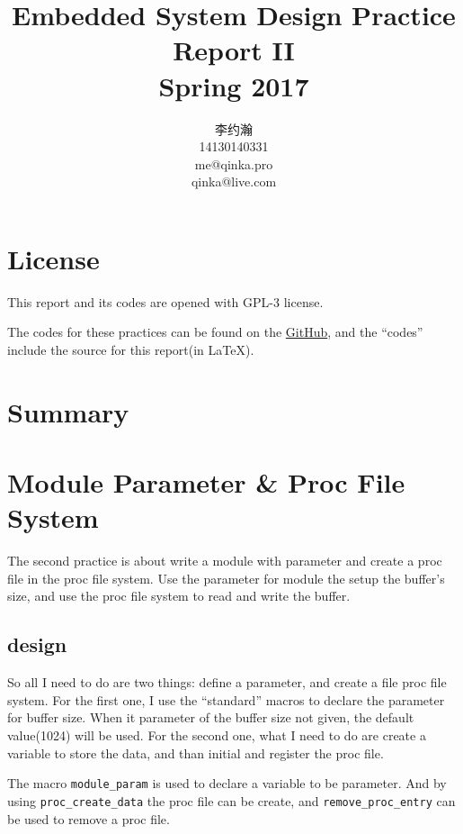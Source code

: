 \documentclass{report}
\title{Embedded System Design Practice Report II \\ Spring 2017}
\author{李约瀚 \\ 14130140331 \\ me@qinka.pro \\ qinka@live.com}
\begin{document}
    \maketitle
    \tableofcontents
    
    \chapter{License}
    \label{chap:license}
    This report and its codes are opened with GPL-3 license.
    
    The codes for these practices can be found on the%
    \href{https://github.com/Qinka/embedded-system-design-homework}{GitHub},
    and the ``codes'' include the source for this report(in \LaTeX).
    
    \chapter{Summary}
    \label{chap:summary}
    
    \chapter{Module Parameter \& Proc File System}
    \label{chap:mpnpsf}
    
    The second practice is about write a module with parameter and create a proc file in the  proc file system.
    Use the parameter for module the setup the buffer's size, and use the proc file system to read and write the buffer.
    
    \section{design}
    \label{chap:mpnpsf:design}
    
    So all I need to do are two things:  define a parameter, and create a file proc file system.
    For the first one, I use the ``standard'' macros to declare the parameter for buffer size.
    When it parameter of the buffer size not given, the default value(1024) will be used.
    For the second one, what I need to do are create a variable to store the data, and than initial and register the proc file.
    
    The macro \lstinline|module_param| is used to declare a variable to be parameter.
    And by using \lstinline|proc_create_data| the proc file can be create, and
    \lstinline|remove_proc_entry| can be used to remove a proc file.
    
\end{document}
